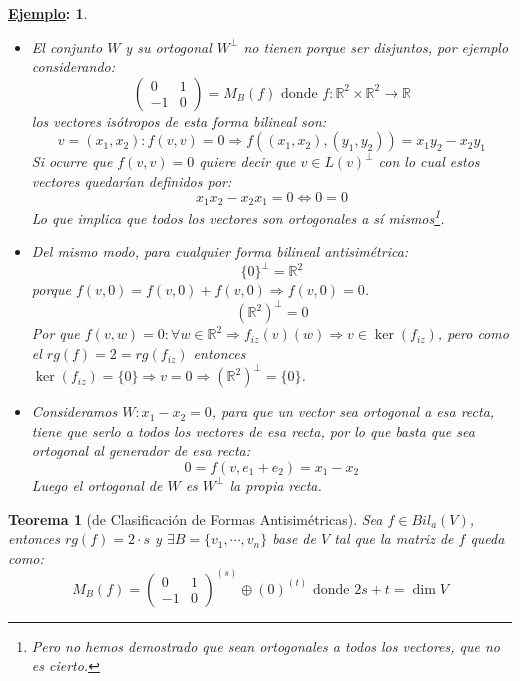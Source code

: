 \documentclass[10pt,a4paper,openright]{book}
\theoremstyle{break}
\newtheorem*{theo}{Teorema}
\newtheorem*{ej}{\underline{Ejemplo}:}
\begin{document}
\begin{ej}
\begin{itemize}
\item El conjunto $W$ y su ortogonal $W^\perp$ no tienen porque ser disjuntos, por ejemplo considerando:
$$\begin{pmatrix}
0 & 1\\ -1 & 0\end{pmatrix}=M_B(f)\mbox{ donde }f:\mathbb R^2\times \mathbb R^2\rightarrow \mathbb R$$
los vectores isótropos de esta forma bilineal son:
$$v=(x_1,x_2): f(v,v)=0\Rightarrow f((x_1,x_2), (y_1,y_2))=x_1y_2- x_2y_1$$
Si ocurre que $f(v,v)=0$ quiere decir que $v\in L(v)^\perp$ con lo cual estos vectores quedarían definidos por:
$$x_1x_2-x_2x_1=0\Leftrightarrow 0=0$$
Lo que implica que todos los vectores son ortogonales a sí mismos\footnote{Pero no hemos demostrado que sean ortogonales a todos los vectores, que no es cierto.}.

\item Del mismo modo, para cualquier forma bilineal antisimétrica:
$$\{0\}^\perp = \mathbb R^2$$
porque $f(v,0) = f(v,0)+f(v,0)\Rightarrow f(v,0)=0$.
$$(\mathbb R^2)^\perp = 0$$
Por que $f(v,w)=0: \forall w \in \mathbb R^2\Rightarrow f_{iz}(v)(w)\Rightarrow v\in \ker(f_{iz})$, pero como el $rg(f)=2=rg(f_{iz})$ entonces $\ker(f_{iz})=\{0\}\Rightarrow v = 0\Rightarrow (\mathbb R^2)^\perp = \{0\}$.

\item Consideramos $W: x_1-x_2=0$, para que un vector sea ortogonal a esa recta, tiene que serlo a todos los vectores de esa recta, por lo que basta que sea ortogonal al generador de esa recta:
$$0=f(v,e_1+e_2)=x_1-x_2$$
Luego el ortogonal de $W$ es $W^\perp$ la propia recta.
\end{itemize}
\end{ej}

\begin{theo}[de Clasificación de Formas Antisimétricas]
Sea $f\in Bil_a(V)$, entonces $rg(f) = 2\cdot s$ y $\exists B =\{v_1, \cdots, v_n\}$ base de $V$ tal que la matriz de $f$ queda como:
$$M_B(f) = \begin{pmatrix} 0 & 1 \\ -1 & 0 \end{pmatrix}^{(s)}\oplus (0)^{(t)}\mbox{ donde }2s+t=\dim V$$
\end{theo}
\end{document}
